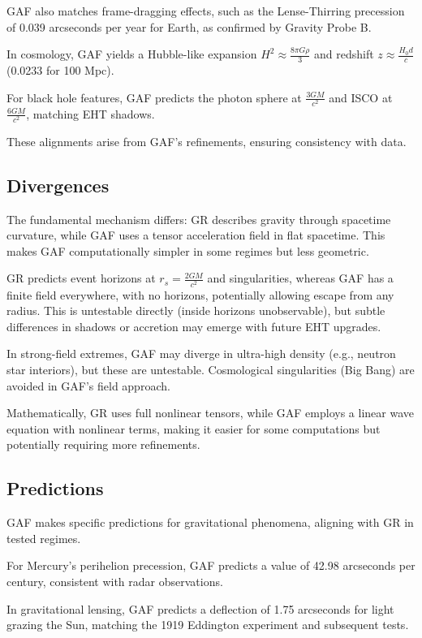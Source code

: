 \documentclass{article}
\begin{document}
GAF also matches frame-dragging effects, such as the Lense-Thirring precession of 0.039 arcseconds per year for Earth, as confirmed by Gravity Probe B.

In cosmology, GAF yields a Hubble-like expansion \( H^2 \approx \frac{8 \pi G \rho}{3} \) and redshift \( z \approx \frac{H_0 d}{c} \) (0.0233 for 100 Mpc).

For black hole features, GAF predicts the photon sphere at \( \frac{3 G M}{c^2} \) and ISCO at ~ \( \frac{6 G M}{c^2} \), matching EHT shadows.

These alignments arise from GAF's refinements, ensuring consistency with data.

\subsection{Divergences}

The fundamental mechanism differs: GR describes gravity through spacetime curvature, while GAF uses a tensor acceleration field in flat spacetime. This makes GAF computationally simpler in some regimes but less geometric.

GR predicts event horizons at \( r_s = \frac{2 G M}{c^2} \) and singularities, whereas GAF has a finite field everywhere, with no horizons, potentially allowing escape from any radius. This is untestable directly (inside horizons unobservable), but subtle differences in shadows or accretion may emerge with future EHT upgrades.

In strong-field extremes, GAF may diverge in ultra-high density (e.g., neutron star interiors), but these are untestable. Cosmological singularities (Big Bang) are avoided in GAF's field approach.

Mathematically, GR uses full nonlinear tensors, while GAF employs a linear wave equation with nonlinear terms, making it easier for some computations but potentially requiring more refinements.

\subsection{Predictions}

GAF makes specific predictions for gravitational phenomena, aligning with GR in tested regimes.

For Mercury's perihelion precession, GAF predicts a value of 42.98 arcseconds per century, consistent with radar observations.

In gravitational lensing, GAF predicts a deflection of 1.75 arcseconds for light grazing the Sun, matching the 1919 Eddington experiment and subsequent tests.
\end{document}
